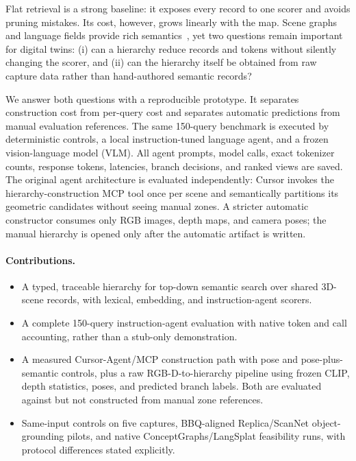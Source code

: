 \documentclass[runningheads]{llncs}
\begin{document}
Flat retrieval is a strong baseline: it exposes every record to one scorer and
avoids pruning mistakes. Its cost, however, grows linearly with the map. Scene
graphs and language fields provide rich semantics~\cite{kerr2023lerf,
langsplat2024,gu2023conceptgraphs,bbq2024}, yet two questions remain important
for digital twins: (i) can a hierarchy reduce records and tokens without
silently changing the scorer, and (ii) can the hierarchy itself be obtained
from raw capture data rather than hand-authored semantic records?

We answer both questions with a reproducible prototype. It separates
construction cost from per-query cost and separates automatic predictions from
manual evaluation references. The same 150-query benchmark is executed by
deterministic controls, a local instruction-tuned language agent, and a frozen
vision-language model (VLM). All agent prompts, model calls, exact tokenizer
counts, response tokens, latencies, branch decisions, and ranked views are
saved. The original agent architecture is evaluated independently: Cursor
invokes the hierarchy-construction MCP tool once per scene and semantically
partitions its geometric candidates without seeing manual zones. A stricter
automatic constructor consumes only RGB images, depth maps, and camera poses;
the manual hierarchy is opened only after the automatic artifact is written.

\paragraph{Contributions.}
\begin{itemize}
\item A typed, traceable hierarchy for top-down semantic search over shared
3D-scene records, with lexical, embedding, and instruction-agent scorers.
\item A complete 150-query instruction-agent evaluation with native token and
call accounting, rather than a stub-only demonstration.
\item A measured Cursor-Agent/MCP construction path with pose and
pose-plus-semantic controls, plus a raw RGB-D-to-hierarchy pipeline using
frozen CLIP, depth statistics, poses, and predicted branch labels. Both are
evaluated against but not constructed from manual zone references.
\item Same-input controls on five captures, BBQ-aligned Replica/ScanNet
object-grounding pilots, and native ConceptGraphs/LangSplat feasibility runs,
with protocol differences stated explicitly.
\end{itemize}
\end{document}

